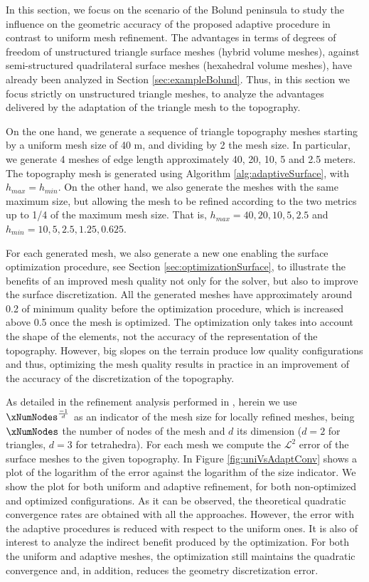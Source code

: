 \documentclass[1p]{elsarticle}
\begin{document}
In this section, we focus  on the scenario of the Bolund peninsula to study the influence on the geometric accuracy of the proposed adaptive procedure in contrast to uniform mesh refinement. 
The advantages in terms of degrees of freedom of unstructured triangle surface meshes (hybrid volume meshes), against semi-structured quadrilateral surface meshes (hexahedral volume meshes), have already been analyzed in Section \ref{sec:exampleBolund}. 
Thus, in this section we focus strictly on unstructured triangle meshes, to analyze the advantages delivered by the adaptation of the triangle mesh to the topography.

On the one hand, we  generate a sequence of triangle topography meshes starting by a uniform mesh size of 40 m, and dividing by 2 the mesh size. In particular, we generate 4 meshes of edge length approximately 40, 20, 10, 5 and 2.5 meters. The topography mesh is generated using Algorithm \ref{alg:adaptiveSurface}, with $h_{max}=h_{min}$.
On the other hand, we  also generate the meshes with the same maximum size, but allowing the mesh to be refined according to the two metrics up to 1/4 of the maximum mesh size. That is, $h_{max}=40,20, 10, 5, 2.5$ and $h_{min}=10, 5, 2.5,1.25,0.625$.

For each generated mesh, we also generate a new one enabling the surface optimization procedure, see Section \ref{sec:optimizationSurface}, to illustrate the benefits of an improved mesh quality not only for the solver, but also to improve the surface discretization.
All the generated meshes have approximately around 0.2 of minimum quality before the optimization procedure, which is increased above 0.5 once the mesh is optimized.
The optimization only takes into account the shape of the elements, not the accuracy of the representation of the topography. However, big slopes on the terrain produce low quality configurations and thus, optimizing the mesh quality results in practice in an improvement of the accuracy of the discretization of the topography.

As detailed in the refinement analysis performed in \cite{arnold2000locally}, herein we use $\xNumNodes^\frac{-1}{d}$ as an indicator of the mesh size for locally refined meshes, being $\xNumNodes$ the number of nodes of the mesh and $d$ its  dimension ($d=2$ for triangles, $d=3$ for tetrahedra).
For each mesh we compute the $\mathcal{L}^2$ error of the surface meshes to the given topography. 
In Figure \ref{fig:uniVsAdaptConv} shows a  plot of the logarithm of the error against  the logarithm of the size indicator.
 We show the plot for both uniform and adaptive refinement, for both non-optimized and optimized configurations.
As it can be observed, the theoretical quadratic convergence rates are obtained with all the approaches.
However, the error with the adaptive procedures is reduced with respect to the uniform ones. 
It is also of interest to analyze the indirect benefit produced by the optimization. For both the uniform and adaptive meshes, the optimization still maintains the quadratic convergence and, in addition, reduces the geometry discretization error. 
\end{document}

